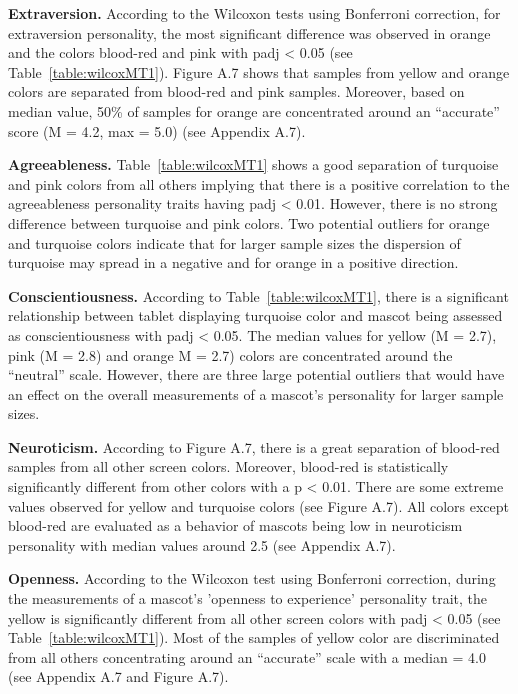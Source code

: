 \par \textbf{Extraversion.} According to the Wilcoxon tests using Bonferroni correction, for extraversion personality, the most significant difference was observed in orange and the colors blood-red and pink with padj < 0.05 (see Table~\ref{table:wilcoxMT1}). Figure A.7 shows that samples from yellow and orange colors are separated from blood-red and pink samples. Moreover, based on median value, 50\% of samples for orange are concentrated around an “accurate” score (M = 4.2, max = 5.0) (see Appendix A.7). 
\par \textbf{Agreeableness.} Table~\ref{table:wilcoxMT1} shows a good separation of turquoise and pink colors from all others implying that there is a positive correlation to the agreeableness personality traits having padj < 0.01. However, there is no strong difference between turquoise and pink colors. Two potential outliers for orange and turquoise colors indicate that for larger sample sizes the dispersion of turquoise may spread in a negative and for orange in a positive direction.
\par \textbf{Conscientiousness.} According to Table~\ref{table:wilcoxMT1}, there is a significant relationship between tablet displaying turquoise color and mascot being assessed as conscientiousness with padj < 0.05. The median values for yellow (M = 2.7), pink (M = 2.8) and orange M = 2.7) colors are concentrated around the “neutral” scale. However, there are three large potential outliers that would have an effect on the overall measurements of a mascot's personality for larger sample sizes.
\par \textbf{Neuroticism.} According to Figure A.7, there is a great separation of blood-red samples from all other screen colors. Moreover, blood-red is statistically significantly different from other colors with a p < 0.01. There are some extreme values observed for yellow and turquoise colors (see Figure A.7). All colors except blood-red are evaluated as a behavior of mascots being low in neuroticism personality with median values around 2.5 (see Appendix A.7). 
\par \textbf{Openness.} According to the Wilcoxon test using Bonferroni correction, during the measurements of a mascot's 'openness to experience' personality trait, the yellow is significantly different from all other screen colors with padj < 0.05 (see Table~\ref{table:wilcoxMT1}). Most of the samples of yellow color are discriminated from all others concentrating around an “accurate” scale with a median = 4.0 (see Appendix A.7 and Figure A.7).

